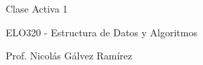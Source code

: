 \documentclass{article}
\begin{document}
\vspace{.5pc}
\centerline{\sc Clase Activa 1}
\centerline{\sc ELO320 - Estructura de Datos y Algoritmos}
\centerline{\sc Prof. Nicolás Gálvez Ramírez}
\vspace{2pc}
\end{document}
